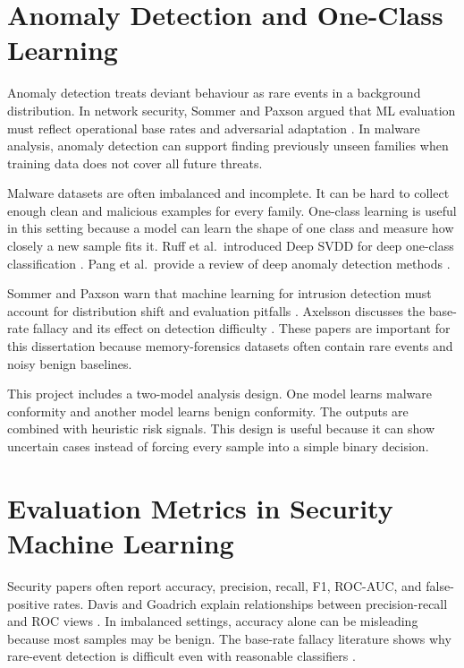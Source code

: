 \section{Anomaly Detection and One-Class Learning}

Anomaly detection treats deviant behaviour as rare events in a background distribution. In network security, Sommer and Paxson argued that ML evaluation must reflect operational base rates and adversarial adaptation \cite{sommer2010outside}. In malware analysis, anomaly detection can support finding previously unseen families when training data does not cover all future threats.

Malware datasets are often imbalanced and incomplete. It can be hard to collect enough clean and malicious examples for every family. One-class learning is useful in this setting because a model can learn the shape of one class and measure how closely a new sample fits it. Ruff et al.\ introduced Deep SVDD for deep one-class classification \cite{ruff2018deep}. Pang et al.\ provide a review of deep anomaly detection methods \cite{pang2021deep}.

Sommer and Paxson warn that machine learning for intrusion detection must account for distribution shift and evaluation pitfalls \cite{sommer2010outside}. Axelsson discusses the base-rate fallacy and its effect on detection difficulty \cite{axelsson1999base}. These papers are important for this dissertation because memory-forensics datasets often contain rare events and noisy benign baselines.

This project includes a two-model analysis design. One model learns malware conformity and another model learns benign conformity. The outputs are combined with heuristic risk signals. This design is useful because it can show uncertain cases instead of forcing every sample into a simple binary decision.

\section{Evaluation Metrics in Security Machine Learning}

Security papers often report accuracy, precision, recall, F1, ROC-AUC, and false-positive rates. Davis and Goadrich explain relationships between precision-recall and ROC views \cite{davis2006roc}. In imbalanced settings, accuracy alone can be misleading because most samples may be benign. The base-rate fallacy literature shows why rare-event detection is difficult even with reasonable classifiers \cite{axelsson1999base}.

